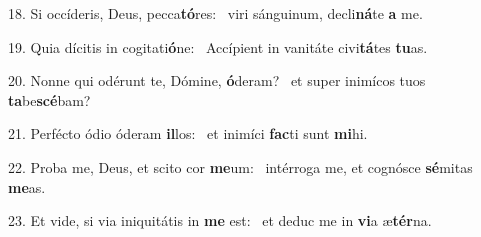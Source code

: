 18. Si occíderis, Deus, pecca\textbf{tó}res: \ast\  viri sánguinum, decli\textbf{ná}te \textbf{a} me.\

19. Quia dícitis in cogitati\textbf{ó}ne: \ast\  Accípient in vanitáte civi\textbf{tá}tes \textbf{tu}as.\

20. Nonne qui odérunt te, Dómine, \textbf{ó}deram? \ast\  et super inimícos tuos \textbf{ta}be\textbf{scé}bam?\

21. Perfécto ódio óderam \textbf{il}los: \ast\  et inimíci \textbf{fac}ti sunt \textbf{mi}hi.\

22. Proba me, Deus, et scito cor \textbf{me}um: \ast\  intérroga me, et cognósce \textbf{sé}mitas \textbf{me}as.\

23. Et vide, si via iniquitátis in \textbf{me} est: \ast\  et deduc me in \textbf{vi}a æ\textbf{tér}na.\

